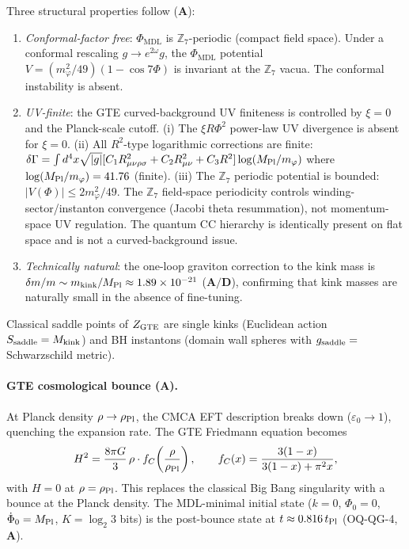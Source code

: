 \documentclass[11pt]{article}
\theoremstyle{remark}
\newcommand{\PHIMDL}{\Phi_{\mathrm{MDL}}}
\newcommand{\ZS}{\mathbb{Z}_7}
\newcommand{\CatA}{\textbf{A}}
\newcommand{\CatAD}{\textbf{A/D}}
\begin{document}
Three structural properties follow ($\CatA$):
\begin{enumerate}[noitemsep]
\item \emph{Conformal-factor free}: $\PHIMDL$ is $\ZS$-periodic (compact field
  space).  Under a conformal rescaling $g\to e^{2\omega}g$, the $\PHIMDL$
  potential $V=(m_\varphi^2/49)(1-\cos7\Phi)$ is invariant at the $\ZS$ vacua.
  The conformal instability is absent.
\item \emph{UV-finite}: the GTE curved-background UV finiteness is controlled
  by $\xi=0$ and the Planck-scale cutoff.
  (i) The $\xi R\Phi^2$ power-law UV divergence is absent for $\xi=0$.
  (ii) All $R^2$-type logarithmic corrections are finite:
  $\delta\Gamma = \int d^4x\sqrt{|g|}[C_1 R_{\mu\nu\rho\sigma}^2
  + C_2 R_{\mu\nu}^2 + C_3 R^2]\log(M_{\rm Pl}/m_\varphi)$
  where $\log(M_{\rm Pl}/m_\varphi) = 41.76$ (finite).
  (iii) The $\ZS$ periodic potential is bounded: $|V(\Phi)|\leq 2m_\varphi^2/49$.
  The $\ZS$ field-space periodicity controls winding-sector/instanton convergence
  (Jacobi theta resummation), not momentum-space UV regulation.
  The quantum CC hierarchy is identically present on flat space and is not
  a curved-background issue.
\item \emph{Technically natural}: the one-loop graviton correction to the kink
  mass is $\delta m/m \sim m_{\rm kink}/M_{\rm Pl} \approx 1.89\times10^{-21}$
  ($\CatAD$), confirming that kink masses are naturally small in the absence of
  fine-tuning.
\end{enumerate}

Classical saddle points of $Z_{\rm GTE}$ are single kinks
(Euclidean action $S_{\rm saddle}=M_{\rm kink}$) and BH instantons
(domain wall spheres with $g_{\rm saddle} =$ Schwarzschild metric).

\paragraph{GTE cosmological bounce ($\CatA$).}
At Planck density $\rho\to\rho_{\rm Pl}$, the CMCA EFT description breaks down
($\varepsilon_0\to1$), quenching the expansion rate.  The GTE Friedmann
equation becomes
\begin{equation}
  H^2 = \frac{8\pi G}{3}\,\rho\cdot f_C\!\left(\frac{\rho}{\rho_{\rm Pl}}\right),
  \qquad
  f_C(x) = \frac{3(1-x)}{3(1-x)+\pi^2 x},
  \label{eq:gte_bounce}
\end{equation}
with $H=0$ at $\rho=\rho_{\rm Pl}$.  This replaces the classical Big Bang
singularity with a bounce at the Planck density.  The MDL-minimal initial
state ($k=0$, $\Phi_0=0$, $\dot\Phi_0=M_{\rm Pl}$, $K=\log_2 3$ bits) is the
post-bounce state at $t\approx 0.816\,t_{\rm Pl}$ (OQ-QG-4, $\CatA$).
\end{document}
